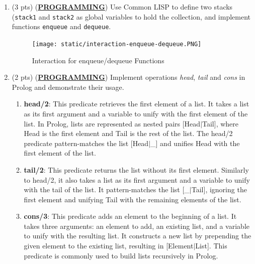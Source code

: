 \documentclass[12pt]{article}
\begin{document}
\begin{spacing}{1.5}
\begin{enumerate}
		\item (3 pts) (\textbf{\uline{PROGRAMMING}}) Use Common LISP to define two stacks (\texttt{stack1} and \texttt{stack2} as global variables to hold the collection, and implement functions \texttt{enqueue} and \texttt{dequeue}.

            

            \begin{figure}[htp]
                \centering
                \texttt{[image: static/interaction-enqueue-dequeue.PNG]}
                \caption{Interaction for enqueue/dequeue Functions}
                \label{fig:figure}
            \end{figure}
		      		      		      		              
		\item (2 pts) (\textbf{\uline{PROGRAMMING}}) Implement operations \textit{head}, \textit{tail} and \textit{cons} in Prolog and demonstrate their usage.

            
		      		      		      
		      \begin{enumerate}
		      	\item \textbf{head/2}: This predicate retrieves the first element of a list. It takes a list as its first argument and a variable to unify with the first element of the list. In Prolog, lists are represented as nested pairs [Head$|$Tail], where Head is the first element and Tail is the rest of the list. The head/2 predicate pattern-matches the list [Head$|$\_] and unifies Head with the first element of the list.
		      	      		      	      		      	      
		      	\item \textbf{tail/2}: This predicate returns the list without its first element. Similarly to head/2, it also takes a list as its first argument and a variable to unify with the tail of the list. It pattern-matches the list [\_$|$Tail], ignoring the first element and unifying Tail with the remaining elements of the list.
		      	      		      	      		      	      
		      	\item \textbf{cons/3}: This predicate adds an element to the beginning of a list. It takes three arguments: an element to add, an existing list, and a variable to unify with the resulting list. It constructs a new list by prepending the given element to the existing list, resulting in [Element$|$List]. This predicate is commonly used to build lists recursively in Prolog.
		      \end{enumerate}
		      		      		      

\end{enumerate}
\end{spacing}
\end{document}
